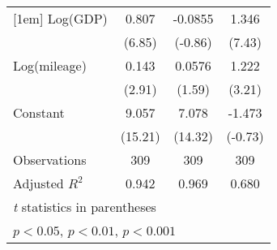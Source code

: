 \begin{tabular}{l*{3}{c}}
    [1em]
    Log(GDP)                      & 0.807\sym{***}                                      & -0.0855                                             & 1.346\sym{***}                                      \\
                                  & (6.85)                                              & (-0.86)                                             & (7.43)                                              \\
    [1em]
    Log(mileage)                  & 0.143\sym{**}                                       & 0.0576                                              & 1.222\sym{**}                                       \\
                                  & (2.91)                                              & (1.59)                                              & (3.21)                                              \\
    [1em]
    Constant                      & 9.057\sym{***}                                      & 7.078\sym{***}                                      & -1.473                                              \\
                                  & (15.21)                                             & (14.32)                                             & (-0.73)                                             \\
    \hline
    Observations                  & 309                                                 & 309                                                 & 309                                                 \\
    Adjusted \(R^{2}\)            & 0.942                                               & 0.969                                               & 0.680                                               \\
    \hline\hline
    \multicolumn{4}{l}{\footnotesize \textit{t} statistics in parentheses}                                                                                                                          \\
    \multicolumn{4}{l}{\footnotesize \sym{*} \(p<0.05\), \sym{**} \(p<0.01\), \sym{***} \(p<0.001\)}                                                                                                \\
\end{tabular}

